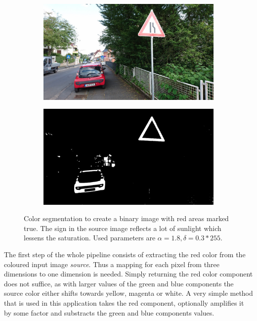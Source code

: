 \documentclass{report}
\begin{document}
\begin{figure}
  \begin{subfigure}[t]{0.5\textwidth}
    \includegraphics[width=1\textwidth]{src/segmentation_source}
  \end{subfigure}
  \quad
  \begin{subfigure}[t]{0.5\textwidth}
    \includegraphics[width=1\textwidth]{src/segmentation_target}
  \end{subfigure}
  \caption{Color segmentation to create a binary image with red areas
    marked true. The sign in the source image reflects a lot of
    sunlight which lessens the saturation. Used parameters are \(
    \alpha = 1.8, \delta = 0.3 * 255. \)}
\end{figure}

The first step of the whole pipeline consists of extracting the red
color from the coloured input image \textit{source}. Thus a mapping
for each pixel from three dimensions to one dimension is
needed. Simply returning the red color component does not suffice, as
with larger values of the green and blue components the source color
either shifts towards yellow, magenta or white. A very simple method
that is used in this application takes the red component, optionally
amplifies it by some factor and substracts the green and blue
components values.
\end{document}
